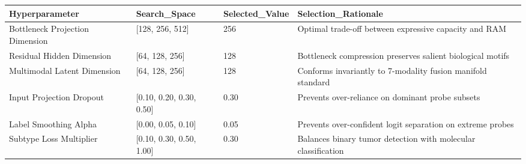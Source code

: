 \begin{tabular}{llll}
\toprule
Hyperparameter & Search_Space & Selected_Value & Selection_Rationale \\
\midrule
Bottleneck Projection Dimension & [128, 256, 512] & 256 & Optimal trade-off between expressive capacity and RAM \\
Residual Hidden Dimension & [64, 128, 256] & 128 & Bottleneck compression preserves salient biological motifs \\
Multimodal Latent Dimension & [64, 128, 256] & 128 & Conforms invariantly to 7-modality fusion manifold standard \\
Input Projection Dropout & [0.10, 0.20, 0.30, 0.50] & 0.30 & Prevents over-reliance on dominant probe subsets \\
Label Smoothing Alpha & [0.00, 0.05, 0.10] & 0.05 & Prevents over-confident logit separation on extreme probes \\
Subtype Loss Multiplier & [0.10, 0.30, 0.50, 1.00] & 0.30 & Balances binary tumor detection with molecular classification \\
\bottomrule
\end{tabular}
